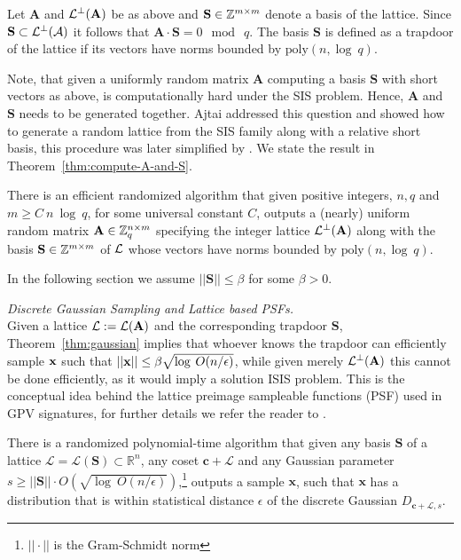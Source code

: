 Let \(\mathbf{A}\) and \(\mathcal{L}^\bot(\mathbf{A})\) be as above and \(\mathbf{S}\in\mathbb{Z}^{m\times m}\)
denote a basis of the lattice. Since \(\mathbf{S}\subset \mathcal{L}^\bot(\mathcal{A})\) it follows that \(\mathbf{A}\cdot \mathbf{S}= 0 \mod \: q\). The basis \(\mathbf{S}\) is defined as a trapdoor of the lattice if its vectors have norms bounded by \(\text{poly}(n,\log\: q)\). 

Note, that given a uniformly random matrix \(\mathbf A\) computing a basis \(\mathbf{S}\) with short vectors as above, is computationally hard under the SIS problem. Hence, \(\mathbf{A}\) and \(\mathbf{S}\) needs to be generated together. Ajtai \cite{ICALP:Ajtai99} addressed this question and showed how to generate a random lattice from the SIS family along with a relative short basis, this procedure was later simplified by \cite{AP11,EC:MicPei12}. We state the result in Theorem~\ref{thm:compute-A-and-S}.
\begin{theorem}\label{thm:compute-A-and-S}
    There is an efficient randomized algorithm that given positive integers, \(n,q\) and \(m \geq C \: n\: \log \: q\), for some universal constant \(C\), outputs a (nearly) uniform random matrix \(\mathbf{A}\in\mathbb{Z}_q^{n\times m}\) specifying the integer lattice \(\mathcal{L}^\bot(\mathbf{A})\) along with the basis \(\mathbf{S}\in\mathbb{Z}^{m \times m}\) of \(\mathcal{L}\) whose vectors have norms bounded by \(\text{poly}(n,\log\: q)\).
\end{theorem}

In the following section we assume \(||\mathbf{S}||\leq \beta\) for some \(\beta>0\).

\bigskip \noindent \textit{Discrete Gaussian Sampling and Lattice based PSFs.} \\
Given a lattice \(\mathcal{L}:=\mathcal{L}(\mathbf{A})\) and the corresponding trapdoor \(\mathbf{S}\), Theorem~\ref{thm:gaussian} implies that whoever knows the trapdoor can efficiently sample \(\mathbf{x}\) such that \(||\mathbf{x}||\leq \beta \sqrt{\log \: O(n/\epsilon)} \), while given merely \(\mathcal{L}^\bot(\mathbf{A})\) this cannot be done efficiently, as it would imply a solution ISIS problem. 
This is the conceptual idea behind the lattice preimage sampleable functions (PSF) used in GPV signatures, for further details we refer the reader to \cite{STOC:GenPeiVai08,peikert_dec}.
\begin{theorem}\label{thm:gaussian}
    There is a randomized polynomial-time algorithm that given any basis \(\mathbf{S}\) of a lattice $\mathcal{L}=\mathcal{L}(\mathbf{S})\subset \mathbb{R}^n$, any coset \(\mathbf{c}+\mathcal{L}\) and any Gaussian parameter \(s\geq ||\mathbf{S}||\cdot O(\sqrt{\log \: O(n/\epsilon)})\),\footnote{ \( ||\cdot|| \) is the Gram-Schmidt norm} outputs a sample \(\mathbf{x}\), such that \(\mathbf{x}\) has a distribution that is within statistical distance \(\epsilon\) of the discrete Gaussian \(D_{\mathbf{c}+\mathcal{L},s}\).
\end{theorem}

